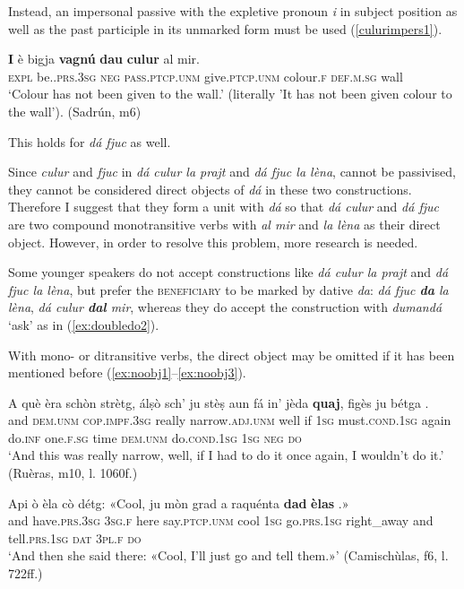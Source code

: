 Instead, an impersonal passive with the expletive pronoun \textit{i} in subject position  as well as the past participle in its unmarked form must be used (\ref{culurimpers1}).

\ea
\label{culurimpers1}
\gll  \textbf{I} è   bigja \textbf{vagnú} \textbf{dau} \textbf{culur} al mir.\\
\textsc{expl} be.\textsc{.prs.3sg} \textsc{neg} \textsc{pass.ptcp.unm} give.\textsc{ptcp.unm}  colour.\textsc{f} \textsc{def.m.sg} wall\\
\glt `Colour has not been given to the wall.' (literally 'It has not been given colour to the wall'). (Sadrún, m6)
\z


This holds for \textit{dá fjuc} as well.

Since \textit{culur} and \textit{fjuc} in \textit{dá culur la prajt} and \textit{dá fjuc la lèna}, cannot be passivised, they cannot be considered direct objects of \textit{dá} in these two constructions. Therefore I suggest that they form a unit with \textit{dá} so that \textit{dá culur} and \textit{dá fjuc} are two compound monotransitive verbs with \textit{al mir} and \textit{la lèna} as their direct object. However, in order to resolve this problem, more research is needed.

Some younger speakers do not accept  constructions like \textit{dá culur la prajt} and \textit{dá fjuc la lèna}, but prefer the \textsc{beneficiary} to be marked by dative \textit{da}:\textit{ dá fjuc \textbf{da} la lèna}, \textit{dá culur \textbf{dal} mir}, whereas they do accept the construction with \textit{dumandá} `ask' as in (\ref{ex:doubledo2}).


With mono- or ditransitive verbs, the direct object may be omitted if it has been mentioned before (\ref{ex:noobj1}--\ref{ex:noobj3}).

\ea
\label{ex:noobj1}
\gll  A què èra schòn strètg, álṣò sch’ ju stèṣ aun fá in’ jèda \textbf{quaj}, figès ju bétga {\ob}\longrule{\cb}.  \\
and \textsc{dem.unm} \textsc{cop.impf.3sg} really narrow.\textsc{adj.unm} well if \textsc{1sg}  must.\textsc{cond.1sg} again do.\textsc{inf} one.\textsc{f.sg} time \textsc{dem.unm} do.\textsc{cond.1sg} \textsc{1sg} \textsc{neg} \textsc{do} \\
\glt `And this was really narrow, well, if I had to do it once again, I wouldn’t do it.' (Ruèras, m10, l. 1060f.)
\z

\ea
\label{ex:noobj2}
\gll    Api ò èla cò détg: «Cool, ju mòn grad a raquénta {\ob}\textbf{dad} \textbf{èlas}{\cb} {\ob}\textbf{{\longrule}}{\cb}.»\\
and have.\textsc{prs.3sg} \textsc{3sg.f} here say.\textsc{ptcp.unm} cool \textsc{1sg}  go.\textsc{prs.1sg} right\_away and tell.\textsc{prs.1sg} \textsc{dat} \textsc{3pl.f} \textsc{do}\\
\glt `And then she said there: «Cool, I’ll just go and tell them.»' (Camischùlas, f6, l. 722ff.)
\z

